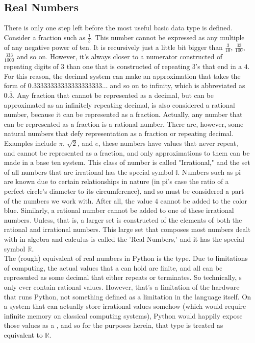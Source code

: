 \subsection{Real Numbers}\label{sec:reals}
There is only one step left before the most useful basic data type is defined. Consider a fraction such as $\frac{1}{3}$. This number cannot be expressed as any multiple of any negative power of ten. It is recursively just a little bit bigger than $\frac{3}{10}$, $\frac{33}{100}$, $\frac{333}{1000}$ and so on. However, it's always closer to a numerator constructed of repeating digits of $3$ than one that is constructed of repeating $3$'s that end in a $4$. For this reason, the decimal system can make an approximation that takes the form of $0.33333333333333333333\ldots$ and so on to infinity, which is abbreviated as $0.\overline{3}$. Any fraction that cannot be represented as a decimal, but can be approximated as an infinitely repeating decimal, is also considered a rational number, because it can be represented as a fraction. Actually, any number that can be represented as a fraction is a rational number. There are, however, some natural numbers that defy representation as a fraction or repeating decimal. Examples include $\pi$, $\sqrt{2}$, and $e$, these numbers have values that never repeat, and cannot be represented as a fraction, and only approximations to them can be made in a base ten system. This class of number is called "Irrational," and the set of all numbers that are irrational has the special symbol $\mathbb{I}$. Numbers such as pi are known due to certain relationships in nature (in pi's case the ratio of a perfect circle's diameter to its circumference), and so must be considered a part of the numbers we work with. After all, the value $4$ cannot be added to the color blue. Similarly, a rational number cannot be added to one of these irrational numbers. Unless, that is, a larger set is constructed of the elements of both the rational and irrational numbers. This large set that composes most numbers dealt with in algebra and calculus is called the 'Real Numbers,' and it has the special symbol $\mathbb{R}$.\\
The (rough) equivalent of real numbers in Python is the  type. Due to limitations of computing, the actual values that a  can hold are finite, and all can be represented as some decimal that either repeats or terminates. So technically, s only ever contain rational values. However, that's a limitation of the hardware that runs Python, not something defined as a limitation in the language itself. On a system that can actually store irrational values somehow (which would require infinite memory on classical computing systems), Python would happily expose those values as a , and so for the purposes herein, that type is treated as equivalent to $\mathbb{R}$.























